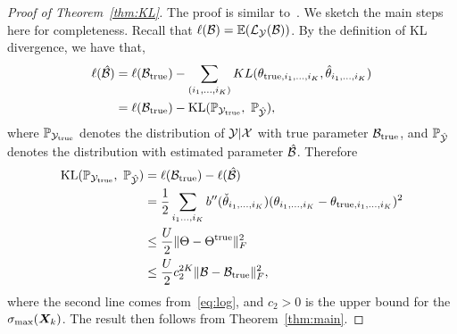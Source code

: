 \documentclass[11pt]{article}
\theoremstyle{plain}
\theoremstyle{definition}
\begin{document}
\begin{proof}[Proof of Theorem~\ref{thm:KL}]
The proof is similar to~\cite{baldin2018optimal}. We sketch the main steps here for completeness. Recall that $\ell(\mathcal{B})=\mathbb{E}(\mathcal{L}_{\mathcal{Y}}(\mathcal{B}))$. By the definition of KL divergence, we have that,
\begin{align}
\ell(\hat \tB)&=\ell(\trueB)-\sum_{(i_1,\ldots,i_K)} KL(\theta_{\text{true}, i_1,\ldots, i_K}, \hat \theta_{i_1,\ldots,i_K})\\
&=\ell(\trueB)-\text{KL}(\mathbb{P}_{\tY_{\text{true}}},\ \mathbb{P}_{\hat \tY}),
\end{align}
where $\mathbb{P}_{\mathcal{Y}_{\text{true}}}$ denotes the distribution of $\mathcal{Y}|\mathcal{X}$ with true parameter $\mathcal{B}_{\text{true}}$, and $\mathbb{P}_{\hat {\mathcal{Y}}}$ denotes the distribution with estimated parameter $\hat {\mathcal{B}}$. Therefore
\begin{align}
\text{KL}(\mathbb{P}_{\mathcal{Y}_{\text{true}}},\ \mathbb{P}_{\hat {\mathcal{Y}}}) &= \ell(\mathcal{B}_{\text{true}})-\ell(\hat {\mathcal{B}})\\
&={1\over 2}\sum_{i_1\ldots,i_K}b''(\check \theta_{i_1,\ldots,i_K})(\theta_{i_1,\ldots,i_K}-\theta_{\text{true},i_1,\ldots,i_K})^2\\
&\leq {U\over 2} \lVert\Theta-\Theta^{\text{true}}\rVert_F^2\\
&\leq {U \over 2}c^{2K}_2\lVert\mathcal{B}-\mathcal{B}_{\text{true}}\rVert_F^2,
\end{align}
where the second line comes from~\eqref{eq:log}, and $c_2>0$ is the upper bound for the $\sigma_{\max}(\bm X_k)$. The result then follows from Theorem~\ref{thm:main}.
\end{proof}
\end{document}
